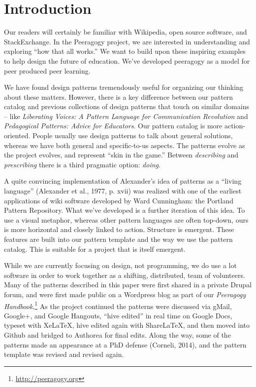 \section{Introduction}

Our readers will certainly be familiar with Wikipedia, open source software, and StackExchange.  In the Peeragogy project, we are interested in understanding and exploring ``how that all works.''    We want to build upon these inspiring examples to help design the future of education.  We've developed peeragogy as a model for peer produced peer learning.

We have found design patterns tremendously useful for organizing our thinking about these matters.  However, there is a key difference between our pattern catalog and previous collections of design patterns that touch on similar domains -- like \emph{Liberating Voices: A Pattern Language for Communication Revolution} and \emph{Pedagogical Patterns: Advice for Educators}.  Our pattern catalog is more action-oriented.  People usually use design patterns to talk about general solutions, whereas we have both general and specific-to-us aspects. The patterns evolve as the project evolves, and represent ``skin in the game.''   Between \emph{describing} and \emph{prescribing} there is a third pragmatic option: \emph{doing}.  

A quite convincing implementation of Alexander’s idea of patterns as a ``living language'' (Alexander et al., 1977, p. xvii) was realized with one of the earliest applications of wiki software developed by Ward Cunningham: the Portland Pattern Repository. What we've developed is a further iteration of this idea. To use a visual metaphor, whereas other pattern languages are often top-down, ours is more horizontal and closely linked to action.  Structure is emergent.  These features are built into our pattern template and the way we use the pattern catalog.  This is suitable for a project that is itself emergent.

While we are currently focusing on design, not programming, we do use a lot software in order to work together as a shifting, distributed, team of volunteers.  Many of the patterns described in this paper were first shared in a private Drupal forum, and were first made public on a Wordpress blog as part of our \emph{Peeragogy Handbook}.\footnote{\url{http://peeragogy.org}}  As the project continued the patterns were discussed via gMail, Google+, and Google Hangouts, ``hive edited'' in real time on Google Docs, typeset with XeLaTeX, hive edited again with ShareLaTeX, and then moved into Github and bridged to Authorea for final edits.  Along the way, some of the patterns made an appearance at a PhD defense (Corneli, 2014), and the pattern template was revised and revised again.  

